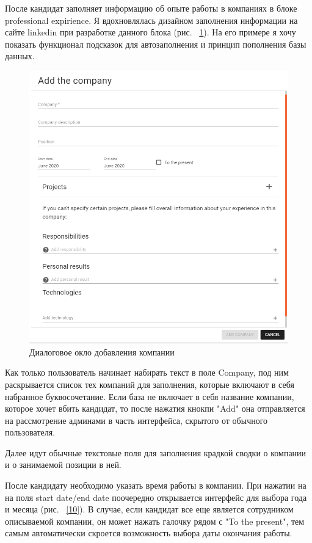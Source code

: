 \documentclass[a4paper,12pt]{diplom}
\begin{document}
После кандидат заполняет информацию об опыте работы в компаниях в блоке professional expirience. Я вдохновлялась дизайном заполнения информации на сайте linkedin при разработке данного блока (рис. ~\ref{9}).
На его примере я хочу показать функционал подсказок для автозаполнения и принцип пополнения базы данных.
\begin{figure}[!ht]
	\centering
	\includegraphics[width=1\textwidth]{resources/companycard.png}
	\caption{Диалоговое окло добавления компании}
	\label{9}
\end{figure}

Как только пользователь начинает набирать текст в поле Company, под ним раскрывается список тех компаний для заполнения, которые включают в себя набранное буквосочетание.
Если база не включает в себя название компании, которое хочет вбить кандидат, то после нажатия кнокпи "Add" она
отправляется на рассмотрение админами в часть интерфейса, скрытого от обычного пользователя.

Далее идут обычные текстовые поля для заполнения крадкой сводки о компании и о занимаемой позиции в ней.

После кандидату необходимо указать время работы в компании. При нажатии на на поля start date/end date поочередно открывается интерфейс для выбора года и месяца (рис. ~\ref{10}). 
В случае, если кандидат все еще является сотрудником описываемой компании, он может нажать галочку рядом с "To the present", тем самым автоматически скроется возможность выбора даты окончания работы.
\end{document}
